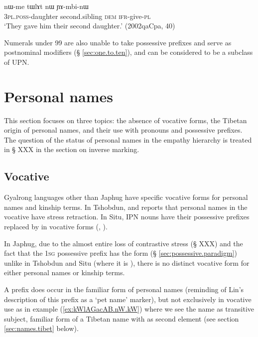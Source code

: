 \begin{exe}
\ex \label{ex:tWlAt}
\gll  nɯ-me tɯlɤt nɯ ɲɤ-mbi-nɯ \\
\textsc{3pl.poss}-daughter second.sibling \textsc{dem} \textsc{ifr}-give-\textsc{pl} \\
\glt `They gave him their second daughter.' (2002qaCpa, 40)
\end{exe} 

Numerals under 99 are also unable to take possessive prefixes and serve as postnominal modifiers (§ \ref{sec:one.to.ten}), and can be considered to be a subclass of UPN.

\section{Personal names}  \label{sec:personal.names}
This section focuses on three topics: the absence of vocative forms, the Tibetan origin of personal names, and their use with pronouns and possessive prefixes. The question of the status of personal names in the empathy hierarchy is treated in § XXX in the section on inverse marking.

\subsection{Vocative} \label{sec:vocative}
Gyalrong languages other than Japhug have specific vocative forms for personal names and kinship terms. In Tshobdun, \citet[133]{jackson98morphology} and \citealt[53]{jackson05yingao} reports that personal names in the vocative have stress retraction. In Situ, IPN nouns have their possessive prefixes replaced by  in vocative forms (\citealt[471]{nagano03cogtse}, \citealt[177]{prins16kyomkyo}). 

In Japhug, due to the almost entire loss of contrastive stress (§ XXX) and the fact that the \textsc{1sg} possessive prefix has the form  (§ \ref{sec:possessive.paradigm}) unlike in Tshobdun and Situ (where it is ), there is no distinct vocative form for either personal names or kinship terms. 

A prefix  does occur in the familiar form of personal names (reminding of Lin's \citeyear[162]{linxr93jiarongen} description of this prefix as a  `pet name' marker), but not exclusively in vocative use as in example (\ref{ex:kWlAGacAB.nW.kW}) where we see the name  as transitive subject, familiar form of a Tibetan name with  as second element (see section \ref{sec:names.tibet} below).

